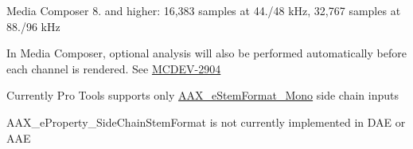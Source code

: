 \begin{DoxyRefList}
\begin{DoxyItemize}
\item Media Composer 8. and higher\+: 16,383 samples at 44./48 k\+Hz, 32,767 samples at 88./96 k\+Hz  
\end{DoxyItemize}
\item[\label{a00381__compatibility_notes000065}%
\hypertarget{a00381__compatibility_notes000065}{}%
global\+Scope$>$ Member \hyperlink{a00283_a6571f4e41a5dd06e4067249228e2249ea5a2bacb421fc36f890a121f01a9e72ba}{A\+A\+X\+\_\+e\+Property\+\_\+\+Optional\+Analysis} ]In Media Composer, optional analysis will also be performed automatically before each channel is rendered. See \hyperlink{a00374_MCDEV-2904}{M\+C\+D\+E\+V-\/2904} 
\item[\label{a00381__compatibility_notes000063}%
\hypertarget{a00381__compatibility_notes000063}{}%
global\+Scope$>$ Member \hyperlink{a00283_a6571f4e41a5dd06e4067249228e2249eae71ad10ce55fb8c4076fe70315b689ae}{A\+A\+X\+\_\+e\+Property\+\_\+\+Side\+Chain\+Stem\+Format} ]Currently Pro Tools supports only \hyperlink{a00206_ad8af5ef008b2bd478add9a0acb0a1d85a0cc08ddb9923a4093c820efe84588947}{A\+A\+X\+\_\+e\+Stem\+Format\+\_\+\+Mono} side chain inputs

A\+A\+X\+\_\+e\+Property\+\_\+\+Side\+Chain\+Stem\+Format is not currently implemented in D\+A\+E or A\+A\+E 


\end{DoxyRefList}
